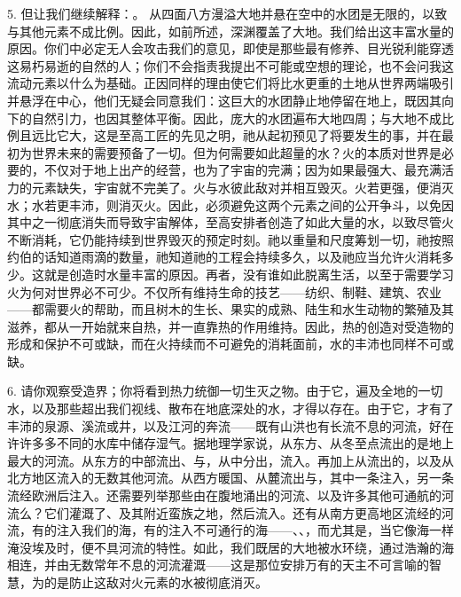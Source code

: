5. 但让我们继续解释：。 从四面八方漫溢大地并悬在空中的水团是无限的，以致与其他元素不成比例。因此，如前所述，深渊覆盖了大地。我们给出这丰富水量的原因。你们中必定无人会攻击我们的意见，即使是那些最有修养、目光锐利能穿透这易朽易逝的自然的人；你们不会指责我提出不可能或空想的理论，也不会问我这流动元素以什么为基础。正因同样的理由使它们将比水更重的土地从世界两端吸引并悬浮在中心，他们无疑会同意我们：这巨大的水团静止地停留在地上，既因其向下的自然引力，也因其整体平衡。因此，庞大的水团遍布大地四周；与大地不成比例且远比它大，这是至高工匠的先见之明，祂从起初预见了将要发生的事，并在最初为世界未来的需要预备了一切。但为何需要如此超量的水？火的本质对世界是必要的，不仅对于地上出产的经营，也为了宇宙的完满；因为如果最强大、最充满活力的元素缺失，宇宙就不完美了。火与水彼此敌对并相互毁灭。火若更强，便消灭水；水若更丰沛，则消灭火。因此，必须避免这两个元素之间的公开争斗，以免因其中之一彻底消失而导致宇宙解体，至高安排者创造了如此大量的水，以致尽管火不断消耗，它仍能持续到世界毁灭的预定时刻。祂以重量和尺度筹划一切，祂按照约伯的话知道雨滴的数量，祂知道祂的工程会持续多久，以及祂应当允许火消耗多少。这就是创造时水量丰富的原因。再者，没有谁如此脱离生活，以至于需要学习火为何对世界必不可少。不仅所有维持生命的技艺——纺织、制鞋、建筑、农业——都需要火的帮助，而且树木的生长、果实的成熟、陆生和水生动物的繁殖及其滋养，都从一开始就来自热，并一直靠热的作用维持。因此，热的创造对受造物的形成和保护不可或缺，而在火持续而不可避免的消耗面前，水的丰沛也同样不可或缺。\par

6. 请你观察受造界；你将看到热力统御一切生灭之物。由于它，遍及全地的一切水，以及那些超出我们视线、散布在地底深处的水，才得以存在。由于它，才有了丰沛的泉源、溪流或井，以及江河的奔流——既有山洪也有长流不息的河流，好在许许多多不同的水库中储存湿气。据地理学家说，从东方、从冬至点流出的是地上最大的河流。从东方的中部流出、与，从中分出，流入。再加上从流出的，以及从北方地区流入的无数其他河流。从西方暖国、从麓流出与，其中一条注入，另一条流经欧洲后注入。还需要列举那些由在腹地涌出的河流、以及许多其他可通航的河流么？它们灌溉了、及其附近蛮族之地，然后流入。还有从南方更高地区流经的河流，有的注入我们的海，有的注入不可通行的海——、、，而尤其是，当它像海一样淹没埃及时，便不具河流的特性。如此，我们既居的大地被水环绕，通过浩瀚的海相连，并由无数常年不息的河流灌溉——这是那位安排万有的天主不可言喻的智慧，为的是防止这敌对火元素的水被彻底消灭。\par

